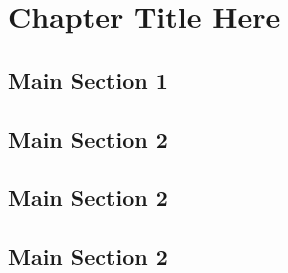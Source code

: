 \chapter{Chapter Title Here} 

\label{ChapterX} %


\section{Main Section 1}


\section{Main Section 2}


\section{Main Section 2}


\section{Main Section 2}
